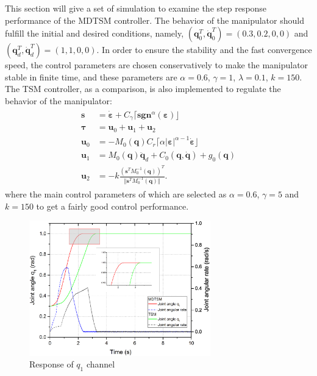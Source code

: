 \documentclass[3p]{elsarticle}
\theoremstyle{plain}
\theoremstyle{remark}
\begin{document}
This section will give a set of simulation to examine the step response performance of the MDTSM controller. The behavior of the manipulator should fulfill the initial and desired conditions, namely, $(\bm q_0^T, \dot{\bm q}_0^T)= (0.3,0.2,0,0)$ and $({\bm q}_d^T,\dot{\bm q}_d^T)=(1,1,0,0)$. In order to ensure the stability and the fast convergence speed, the control parameters are chosen conservatively to make the manipulator stable in finite time, and these parameters are $\alpha = 0.6$, $\gamma = 1$, $\lambda = 0.1$, $k = 150$. The TSM controller, as a comparison, is also implemented to regulate the behavior of the manipulator:
\begin{align}
\begin{split}
\bm s &= \dot{\bm \varepsilon}+C_\gamma\lceil\bm{sgn}^\alpha(\bm \varepsilon)\rfloor\\
\bm\tau &= \bm u_0+\bm u_1 +\bm u_2\\
\bm u_0 &= -M_0(\bm q)C_r\lceil\alpha\vert\bm\varepsilon\vert^{\alpha-1}\dot{\bm \varepsilon}\rfloor\\
\bm u_1 &= M_0(\bm q)\ddot {\bm q}_d+C_0(\bm q,\dot {\bm q})+g_0(\bm q)\\
\bm u_2 &= -k\frac{(\bm s^TM_0^{-1}(\bm q))^T}{\Vert\bm s^TM_0^{-1}(\bm q)\Vert}.
\end{split}
\end{align}
where the main control parameters of which are selected as $\alpha = 0.6$, $\gamma = 5$ and $k = 150$ to get a fairly good control performance.

\begin{figure}[http]
\centering
\includegraphics[width=0.7\textwidth]{paper3_fig4.eps}
\caption{Response of $q_1$ channel}
\label{Figure:4}
\end{figure}
\end{document}
